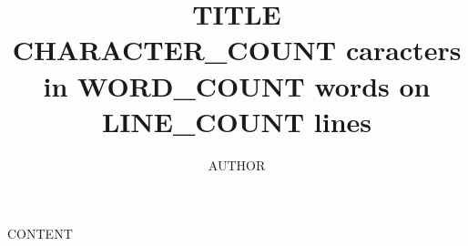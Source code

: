 \documentclass[8pt, twocolumn]{article}
\title{TITLE \\ \vspace{6pt}	\small{CHARACTER_COUNT caracters in WORD_COUNT words on LINE_COUNT lines}}
\author{AUTHOR}
\begin{document}
	\maketitle
		
	CONTENT
		
\end{document}
